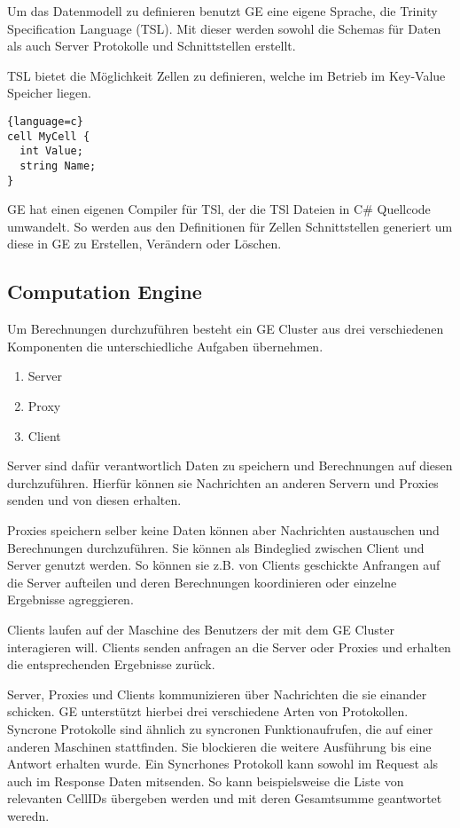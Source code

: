 Um das Datenmodell zu definieren benutzt GE eine eigene Sprache, die Trinity Specification Language (TSL). Mit dieser werden sowohl die Schemas
für Daten als auch Server Protokolle und Schnittstellen erstellt. 

TSL bietet die Möglichkeit Zellen zu definieren, welche im Betrieb im Key-Value Speicher liegen.

\begin{lstlisting}{language=c}
cell MyCell {
  int Value;
  string Name;
}
\end{lstlisting}

GE hat einen eigenen Compiler für TSl, der die TSl Dateien in C\# Quellcode umwandelt. So werden aus den Definitionen für Zellen Schnittstellen
generiert um diese in GE zu Erstellen, Verändern oder Löschen. 

\subsection{Computation Engine}

Um Berechnungen durchzuführen besteht ein GE Cluster aus drei verschiedenen Komponenten die unterschiedliche Aufgaben übernehmen.

\begin{enumerate}
  \item Server
  \item Proxy
  \item Client
\end{enumerate}


Server sind dafür verantwortlich Daten zu speichern und Berechnungen auf diesen durchzuführen.
Hierfür können sie Nachrichten an anderen Servern und Proxies senden und von diesen erhalten.

Proxies speichern selber keine Daten können aber Nachrichten austauschen und Berechnungen durchzuführen. Sie können als 
Bindeglied zwischen Client und Server genutzt werden. So können sie z.B. von Clients geschickte Anfrangen auf die Server aufteilen und deren
Berechnungen koordinieren oder einzelne Ergebnisse agreggieren.

Clients laufen auf der Maschine des Benutzers der mit dem GE Cluster interagieren will. Clients senden anfragen an die Server oder Proxies und
erhalten die entsprechenden Ergebnisse zurück.

Server, Proxies und Clients kommunizieren über Nachrichten die sie einander schicken. GE unterstützt hierbei drei verschiedene Arten von Protokollen.
Syncrone Protokolle sind ähnlich zu syncronen Funktionaufrufen, die auf einer anderen Maschinen stattfinden. Sie blockieren die weitere Ausführung bis
eine Antwort erhalten wurde. Ein Syncrhones Protokoll kann sowohl im Request als auch im Response Daten mitsenden. So kann beispielsweise die Liste von
relevanten CellIDs übergeben werden und mit deren Gesamtsumme geantwortet weredn.

